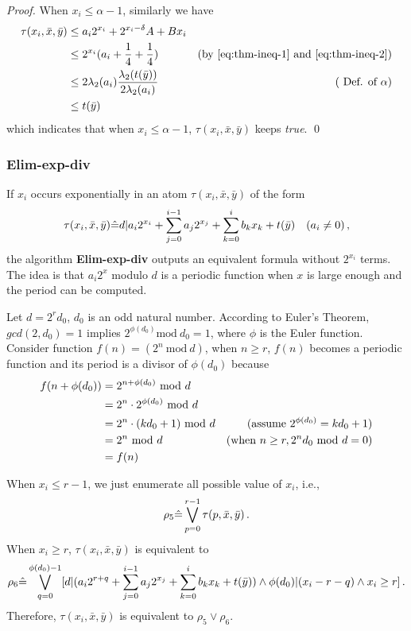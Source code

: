 \begin{proof}
When $x_i \le \alpha-1$, similarly we have
\begin{align}
    \tau(x_i,\bar{x},\bar{y})\notag 
    & \le  a_i 2^{x_i} + 2^{x_i -\delta}A  + Bx_i &  \notag \\
    & \le  2^{x_i}(a_i +\frac{1}{4} +\frac{1}{4}) &(\mbox{by \eqref{eq:thm-ineq-1} and  \eqref{eq:thm-ineq-2}}) \notag \\
   & \le  2\lambda_2(a_i)\frac{\lambda_2(t(\bar{y}))}{2\lambda_2(a_i)} &  (\mbox{ Def. of } \alpha) \notag \\
   &  \le  t(\bar{y}) & \notag 
\end{align}
which indicates that when  $x_i \le \alpha-1$, $\tau(x_i,\bar{x},\bar{y})$ keeps \textit{true}. \qed 
\end{proof}

\subsubsection{Elim-exp-div}

If $x_i$ occurs exponentially in an atom $\tau(x_i,\bar{x},\bar{y})$ of the form
$$\tau(x_i,\bar{x},\bar{y}) \hat{=}  d| a_i 2^{x_i}+\sum_{j=0}^{i-1} a_j 2^{x_j} + \sum_{k=0}^{i} b_k x_k+t(\bar{y}) \quad (a_i \neq 0)\,,$$
the algorithm \textbf{Elim-exp-div} outputs an equivalent formula without $2^{x_i}$ terms.
The idea is that $a_i 2^x$ modulo $d$ is a periodic function when $x$ is large enough and the period can be computed.

Let $d = 2^rd_0$, $d_0$ is an odd natural number. 
According to Euler's Theorem, 
$gcd(2,d_0)=1$ implies
$2^{\phi(d_0)} \text{mod}\ d_0 = 1$,
where $\phi$ is the Euler function.
Consider function $f(n)=(2^n\ \text{mod} \ d)$,
when $n\ge r$, 
$f(n)$ becomes a periodic function and its period is a divisor of $\phi(d_0)$ because
\begin{align}
    f(n+\phi(d_0)) 
    &=2^{n+\phi(d_0)}\ \text{mod}\ d &\notag\\
    &=2^n\cdot 2^{\phi(d_0)}\ \text{mod}\ d &\notag\\
    &=2^n\cdot (k d_0 + 1) \ \text{mod}\ d &
    (\mbox{assume } 2^{\phi(d_0)}=k d_0 +1) \notag \\
    &= 2^n \ \text{mod}\ d &
    (\mbox{when } n\ge r, 2^n d_0\ \text{mod}\ d = 0 )\notag\\
    &= f(n) \notag
\end{align}

When $x_i\le r-1$, we just enumerate all possible value of $x_i$, i.e., 
$$\rho_5 \hat{=} \bigvee_{p=0}^{r-1} \tau(p,\bar{x},\bar{y})\,.$$
When $x_i\ge r$, $\tau(x_i,\bar{x},\bar{y})$ is equivalent to
$$
\rho_6 \hat{=} \bigvee_{q=0}^{\phi(d_0)-1} [d|(a_i 2^{r+q}+\sum_{j=0}^{i-1} a_j 2^{x_j}
+  \sum_{k=0}^{i} b_k x_k+t(\bar{y})) \wedge \phi(d_0)|(x_i-r-q) \wedge x_i \ge r] \,.
$$
            Therefore,  $\tau(x_i,\bar{x},\bar{y})$ is equivalent to  $\rho_5 \vee \rho_6$.

